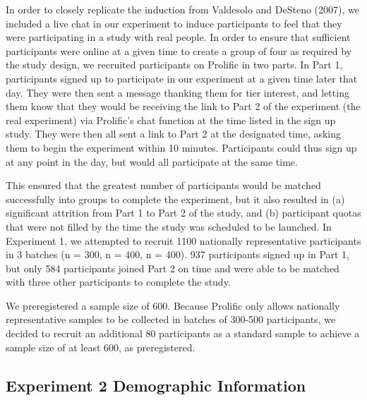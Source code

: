 \documentclass[12pt,]{article}
\begin{document}
In order to closely replicate the induction from Valdesolo and DeSteno (2007), we included a live chat in our experiment to induce participants to feel that they were participating in a study with real people. In order to ensure that sufficient participants were online at a given time to create a group of four as required by the study design, we recruited participants on Prolific in two parts. In Part 1, participants signed up to participate in our experiment at a given time later that day. They were then sent a message thanking them for tier interest, and letting them know that they would be receiving the link to Part 2 of the experiment (the real experiment) via Prolific's chat function at the time listed in the sign up study. They were then all sent a link to Part 2 at the designated time, asking them to begin the experiment within 10 minutes. Participants could thus sign up at any point in the day, but would all participate at the same time. 

This ensured that the greatest number of participants would be matched successfully into groups to complete the experiment, but it also resulted in (a) significant attrition from Part 1 to Part 2 of the study, and (b) participant quotas that were not filled by the time the study was scheduled to be launched. In Experiment 1,  we attempted to recruit 1100 nationally representative participants in 3 batches (n = 300, n = 400, n = 400). 937 participants signed up in Part 1, but only 584 participants joined Part 2 on time and were able to be matched with three other participants to complete the study.  

We preregistered a sample size of 600. Because Prolific only allows nationally representative samples to be collected in batches of 300-500 participants, we decided to recruit an additional 80 participants as a standard sample to achieve a sample size of at least 600, as preregistered. 



\clearpage
\subsection{Experiment 2 Demographic Information}
\label{appendix:recruit_2}
\end{document}
